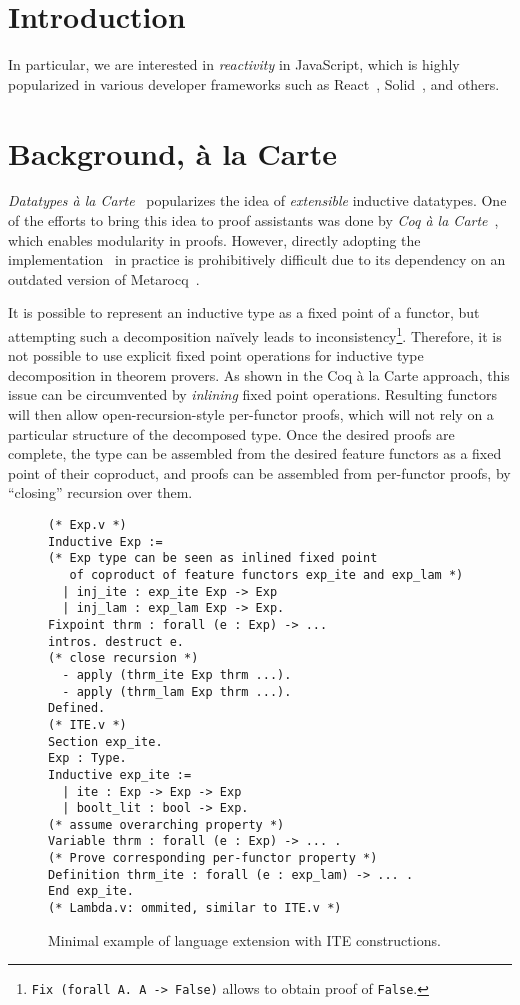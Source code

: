 \documentclass[sigplan,nonacm]{acmart}
\begin{document}
\section{Introduction}


In particular,
we are interested in \emph{reactivity} in JavaScript,
which is highly popularized in various developer frameworks
such as React~\cite{React}, Solid~\cite{Solid}, and others.

\section{Background, à la Carte}

\emph{Datatypes à la Carte}~\cite{swierstra2008data}
popularizes the idea of
\emph{extensible} inductive datatypes. 
One of the efforts to bring this idea to proof assistants
was done by \emph{Coq à la Carte}~\cite{forster2020coq},
which enables modularity in proofs.
However,
directly adopting the implementation~\cite{forster2020coq} in practice
is prohibitively difficult
due to its dependency on an outdated version of Metarocq~\cite{sozeau2020metacoq}.

It is possible to represent an inductive type as a fixed point of a functor,
but attempting such a decomposition na\"ively leads to inconsistency\footnote{\texttt{Fix (forall A. A -> False)} allows to obtain proof of \texttt{False}.}. 
Therefore, it is not possible to use explicit fixed point operations for inductive type decomposition in theorem provers.
As shown in the Coq à la Carte approach,
this issue can be circumvented by \emph{inlining} fixed point operations.  
Resulting functors will then allow open-recursion-style per-functor proofs,
which will not rely on a particular structure of the decomposed type.
Once the desired proofs are complete,
the type can be assembled from the desired feature functors as a fixed point of their coproduct,
and proofs can be assembled from
per-functor proofs,
by ``closing'' recursion over them.

\begin{figure}
\begin{lstlisting}[language=Coq]
(* Exp.v *)
Inductive Exp := 
(* Exp type can be seen as inlined fixed point 
   of coproduct of feature functors exp_ite and exp_lam *)
  | inj_ite : exp_ite Exp -> Exp
  | inj_lam : exp_lam Exp -> Exp.
Fixpoint thrm : forall (e : Exp) -> ...
intros. destruct e.
(* close recursion *)
  - apply (thrm_ite Exp thrm ...).
  - apply (thrm_lam Exp thrm ...).
Defined.
(* ITE.v *)
Section exp_ite.
Exp : Type.
Inductive exp_ite := 
  | ite : Exp -> Exp -> Exp
  | boolt_lit : bool -> Exp.
(* assume overarching property *)
Variable thrm : forall (e : Exp) -> ... .
(* Prove corresponding per-functor property *)
Definition thrm_ite : forall (e : exp_lam) -> ... .
End exp_ite.
(* Lambda.v: ommited, similar to ITE.v *)
\end{lstlisting}
  \caption{Minimal example of language extension with ITE constructions.}
  \label{fig:alacart_example}
\end{figure}
\end{document}
